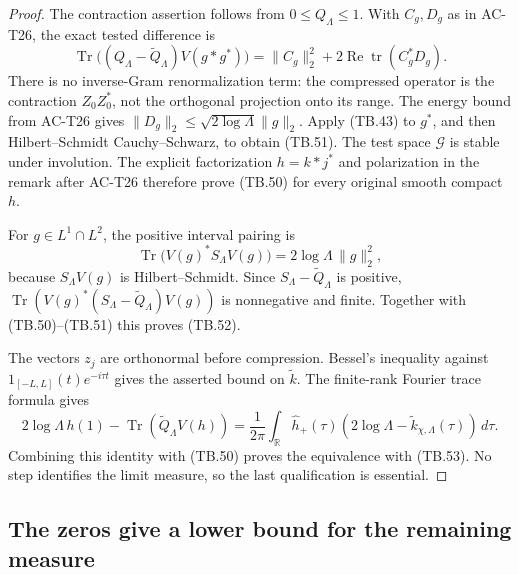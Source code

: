 \begin{proof}
The contraction assertion follows from \(0\leq Q_\Lambda\leq1\).
With \(C_g,D_g\) as in AC-T26, the exact tested difference is
\[
 \operatorname{Tr}\bigl((Q_\Lambda-\widetilde Q_\Lambda)
                                      V(g*g^*)\bigr)
       =\|C_g\|_2^2+
                    2\operatorname{Re}\operatorname{tr}(C_g^*D_g).
 \tag{TB.54}
\]
There is no inverse-Gram renormalization term: the compressed
operator is the contraction \(Z_0Z_0^*\), not the orthogonal
projection onto its range.
The energy bound from AC-T26 gives
\(\|D_g\|_2\leq\sqrt{2\log\Lambda}\|g\|_2\).
Apply (TB.43) to \(g^*\), and then Hilbert--Schmidt
Cauchy--Schwarz, to obtain (TB.51).
The test space \(\mathscr G\) is stable under involution.
The explicit factorization \(h=k*j^*\) and polarization in
the remark after AC-T26 therefore prove (TB.50) for every
original smooth compact \(h\).

For \(g\in L^1\cap L^2\), the positive interval pairing is
\[
 \operatorname{Tr}\bigl(V(g)^*S_\Lambda V(g)\bigr)
                    =2\log\Lambda\,\|g\|_2^2,
\]
because \(S_\Lambda V(g)\) is Hilbert--Schmidt.
Since \(S_\Lambda-\widetilde Q_\Lambda\) is positive,
\(\operatorname{Tr}(V(g)^*(S_\Lambda-\widetilde Q_\Lambda)V(g))\)
is nonnegative and finite.
Together with (TB.50)--(TB.51) this proves (TB.52).

The vectors \(z_j\) are orthonormal before compression.
Bessel's inequality against
\(1_{[-L,L]}(t)e^{-i\tau t}\) gives the asserted bound on
\(\widetilde k\).  The finite-rank Fourier trace formula gives
\[
 2\log\Lambda\,h(1)
       -\operatorname{Tr}(\widetilde Q_\Lambda V(h))
 =\frac1{2\pi}\int_{\mathbb R}\widehat h_+(\tau)
                    (2\log\Lambda-\widetilde k_{\chi,\Lambda}(\tau))
                                               \,d\tau .
\]
Combining this identity with (TB.50) proves the equivalence
with (TB.53).  No step identifies the limit measure, so the
last qualification is essential.
\end{proof}

\subsection{The zeros give a lower bound for the remaining measure}

